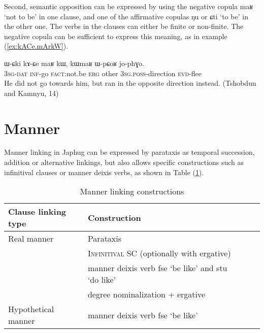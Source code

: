 \documentclass[oldfontcommands,oneside,a4paper,11pt]{article}
\newcommand{\ipa}[1]{{\phon \mbox{#1}}} %
\newcommand{\refb}[1]{(\ref{#1})}
\begin{document}
Second, semantic opposition can be expressed by using the negative copula \ipa{maʁ} `not to be' in one clause, and one of the affirmative copulas \ipa{ŋu} or \ipa{ɕti} `to be' in the other one. The verbs in the clauses can either be finite or non-finite. The negative copula can be sufficient to express this meaning, as in example \refb{ex:kACe.mArkW}.

\begin{exe}
\ex \label{ex:kACe.mArkW}
\gll
\ipa{ɯ-ɕki}  	\ipa{kɤ-ɕe}  	\ipa{maʁ}  	\ipa{kɯ,}  	\ipa{kɯmaʁ}  	\ipa{ɯ-pɕoʁ}  	\ipa{jo-phɣo.}  \\
\textsc{3sg-dat} \textsc{inf}-go \textsc{fact}:not.be \textsc{erg} other \textsc{3sg.poss}-direction \textsc{evd}-flee \\
 \glt He did not go towards him, but ran in the opposite direction instead. (Tshobdun and Kamnyu, 14)
\end{exe}
 

%
% 
	 
	 

\section{Manner} \label{sec:manner}

Manner linking in Japhug can be expressed by parataxis as temporal succession, addition or alternative linkings, but also allows specific constructions such as infinitival clauses or manner deixis verbs, as shown in Table \refb{tab:manner}.

\begin{table}[h]
\caption{Manner linking constructions} \label{tab:manner}
\begin{tabular}{lllll}
\toprule
 Clause linking type &Construction \\
\midrule
Real manner & Parataxis \\
& \textsc{Infinitival} SC (optionally with ergative)\\
& manner deixis   verb \ipa{fse} `be like' and \ipa{stu} `do like' \\
& degree nominalization + ergative \\
\midrule
Hypothetical manner & manner deixis   verb \ipa{fse} `be like'   \\
\bottomrule
\end{tabular}
\end{table}
 
\end{document}
